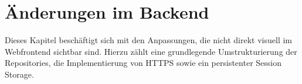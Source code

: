 \section{Änderungen im Backend}\label{sec:aenderungen-im-backend}
Dieses Kapitel beschäftigt sich mit den Anpassungen, die nicht direkt visuell im Webfrontend sichtbar sind.
Hierzu zählt eine grundlegende Umstrukturierung der Repositories, die Implementierung von HTTPS sowie ein persistenter Session Storage.


\newpage

\newpage

